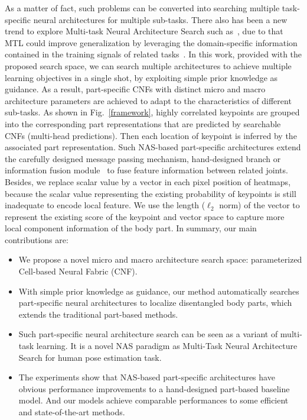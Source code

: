 \documentclass[journal]{IEEEtran}
\begin{document}
As a matter of fact, such problems can be converted into searching multiple task-specific neural architectures for multiple sub-tasks. There also has been a new trend to explore Multi-task Neural Architecture Search such as~\cite{liang2018evolutionary,newell2019feature,gao2020mtl}, due to that MTL could improve generalization by leveraging the domain-specific information contained in the training signals of related tasks~\cite{caruana1998multitask}. In this work, provided with the proposed search space, we can search multiple architectures to achieve multiple learning objectives in a single shot, by exploiting simple prior knowledge as guidance.  As a result, part-specific CNFs with distinct micro and macro architecture parameters are achieved to adapt to the characteristics of different sub-tasks. As shown in Fig.~\ref{framework}, highly correlated keypoints are grouped into the corresponding part representations that are predicted by searchable CNFs (multi-head predictions). Then each location of keypoint is inferred by the associated part representation. Such NAS-based part-specific architectures extend the carefully designed message passing mechanism, hand-designed branch or information fusion module~\cite{Chu_2016_CVPR,Tang_2019_CVPR, li2014heterogeneous} to fuse feature information between related joints. Besides, we replace scalar value by a vector in each pixel position of heatmaps, because the scalar value representing the existing probability of keypoints is still inadequate to encode local feature. We use the length ($\ell_{2}$ norm) of the vector to represent the existing score of the keypoint and vector space to capture more local component information of the body part. In summary, our main contributions are: 
 
 
\begin{itemize}
	\item We propose a novel micro and macro architecture search space: parameterized Cell-based Neural Fabric (CNF).
	\item With simple prior knowledge as guidance, our method automatically searches part-specific neural architectures to localize disentangled body parts, which extends the traditional part-based methods.
	\item Such part-specific neural architecture search can be seen as a variant of multi-task learning. It is a novel NAS paradigm as Multi-Task Neural Architecture Search for human pose estimation task.
	\item The experiments show that NAS-based part-specific architectures have obvious performance improvements to a hand-designed part-based baseline model. And our models achieve comparable performances to some efficient and state-of-the-art methods.

\end{itemize}
\end{document}
